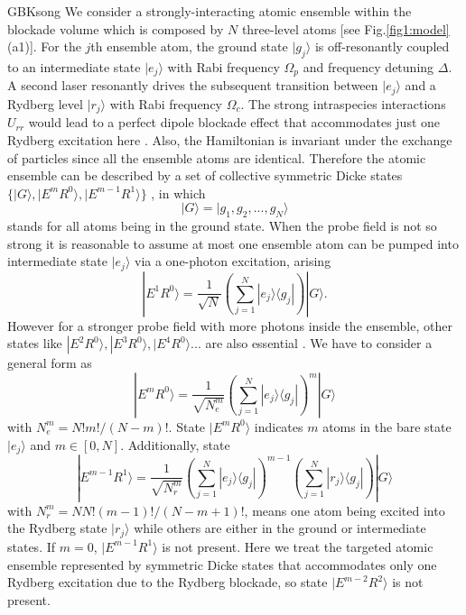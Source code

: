 \documentclass{cpbtex}
\begin{document}
\begin{CJK*}{GBK}{song}
We consider a strongly-interacting atomic ensemble within the blockade volume which is composed by $N$ three-level atoms [see Fig.\ref{fig1:model}(a1)]. For the $j$th ensemble atom, the ground state $|g_j\rangle$ is off-resonantly coupled to an intermediate state $|e_j\rangle$ with Rabi frequency $\Omega_p$ and frequency detuning $\Delta$. A second laser resonantly drives the subsequent transition between $|e_j\rangle$ and a Rydberg level $|r_j\rangle$ with Rabi frequency $\Omega_c$. The strong intraspecies interactions $U_{rr}$ would lead to a perfect dipole blockade effect that accommodates just one Rydberg excitation here \cite{PhysRevLett.87.037901,doi:10.1126/science.1217901}. Also, the Hamiltonian is invariant under the exchange of particles since all the ensemble atoms are identical. Therefore the atomic ensemble can be described by a set of collective symmetric Dicke states $\{|G\rangle,|E^mR^0\rangle,|E^{m-1}R^1\rangle\}$ \cite{Carmele_2014}, in which
\begin{equation}
|G\rangle=|g_1,g_2,...,g_N\rangle
\end{equation}
stands for all atoms being in the ground state. When the probe field is not so strong it is reasonable to assume at most one ensemble atom can be pumped into intermediate state $|e_j\rangle$ via a one-photon excitation, arising
\begin{equation}
   |E^{1}R^{0}\rangle=\frac{1}{\sqrt{N}}(\sum_{j=1}^{N}|e_j\rangle  \langle g_j|) |G\rangle.
\end{equation}
However for a stronger probe field with more photons inside the ensemble, other states like $|E^2R^0\rangle,|E^3R^0\rangle,|E^4R^0\rangle ...$ are also essential \cite{PhysRevA.87.023827}. We have to consider a general form as 
\begin{equation}
   |E^{m}R^{0}\rangle=\frac{1}{\sqrt{N_e^m}}(\sum_{j=1}^{N}|e_j\rangle  \langle g_j|)^m |G\rangle
\end{equation}
with $N_e^m=N!m!/{(N-m)!}$. State $|E^{m}R^{0}\rangle$ indicates $m$ atoms in the bare state $|e_j\rangle$ and $m\in[0,N]$. Additionally, state
\begin{equation}
    |E^{m-1}R^{1}\rangle=\frac{1}{\sqrt{N_r^m}}(\sum_{j=1}^{N}|e_j\rangle  \langle g_j|)^{m-1}(\sum_{j=1}^{N}|r_j\rangle  \langle g_j|) |G\rangle 
\end{equation}
with $N_r^m=N N!(m-1)!/(N-m+1)!$, means one atom being excited into the Rydberg state $|r_j\rangle$ while others are either in the ground or intermediate states. 
If $m=0$, $|E^{m-1}R^{1}\rangle$ is not present.
Here we treat the targeted atomic ensemble represented by symmetric Dicke states that accommodates only one Rydberg excitation due to the Rydberg blockade, so state $|E^{m-2}R^2\rangle$ is not present. 




\end{CJK*}
\end{document}
